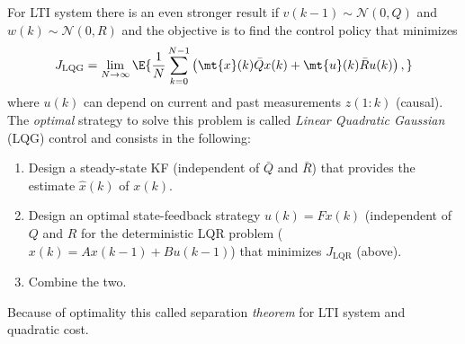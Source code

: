 \documentclass[]{hsrzf}
\theoremstyle{plain}
\theoremstyle{definition}
\theoremstyle{remark}
\begin{document}
For LTI system there is an even stronger result if $v(k-1) \sim \mathcal{N}(0,
Q)$ and $w(k) \sim \mathcal{N}(0, R)$ and the objective is to find the
control policy that minimizes
\[
  J_\text{LQG} = \lim_{N \to\infty} \E{
    \frac{1}{N} \sum_{k=0}^{N-1} \left(
      \mt{x}(k) \bar{Q} x(k) + \mt{u}(k) \bar{R} u(k)
    \right),
  }
\]
where $u(k)$ can depend on current and past measurements $z(1:k)$ (causal).
The \emph{optimal} strategy to solve this problem is called \emph{Linear
Quadratic Gaussian} (LQG) control and consists in the following:
\begin{enumerate}
  \item Design a steady-state KF (independent of $\bar{Q}$ and $\bar{R}$) that
    provides the estimate $\hat{x}(k)$ of $x(k)$.
  \item Design an optimal state-feedback strategy $u(k) = Fx(k)$ (independent
    of $Q$ and $R$ for the deterministic LQR problem ($x(k) = Ax(k-1) +
    Bu(k-1)$) that minimizes $J_\text{LQR}$ (above).
  \item Combine the two.
\end{enumerate}
Because of optimality this called separation \emph{theorem} for LTI system and
quadratic cost.
\end{document}
